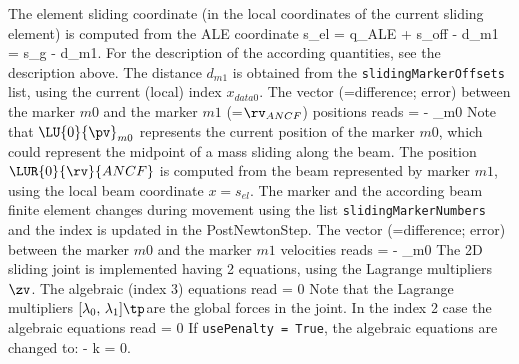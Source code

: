    The element sliding coordinate (in the local coordinates of the current sliding element) is computed from the ALE coordinate
    \be
      s_{el} = q_{ALE} + s_{off} - d_{m1} = s_g - d_{m1}.
    \ee
    For the description of the according quantities, see the description above. The distance $d_{m1}$ is obtained from the \texttt{slidingMarkerOffsets} list, using the current (local) index $x_{data0}$.
    The vector (=difference; error) between the marker $m0$ and the marker $m1$ (=$\rv_{ANCF}$) positions reads
    \be
       =  - _{m0}
    \ee
    Note that $\LU{0}{\pv}_{m0}$ represents the current position of the marker $m0$, which could represent the midpoint of a mass sliding along the beam.
    The position $\LUR{0}{\rv}{ANCF}$ is computed from the beam represented by marker $m1$, using the local beam coordinate $x=s_{el}$. 
    The marker and the according beam finite element changes during movement using the list \texttt{slidingMarkerNumbers} and the index is updated in the PostNewtonStep.
    The vector (=difference; error) between the marker $m0$ and the marker $m1$ velocities reads
    \be
       =  - _{m0}
    \ee
    The 2D sliding joint is implemented having 2 equations, using the Lagrange multipliers $\zv$. 
    The algebraic (index 3) equations read
    \be
       = 0
    \ee
    Note that the Lagrange multipliers $[\lambda_0,\,\lambda_1]\tp$are the global forces in the joint.
    In the index 2 case the algebraic equations read
    \be
       = 0
    \ee
    If \texttt{usePenalty = True}, the algebraic equations are changed to:
    \be
       -  k \zv = 0.
    \ee

